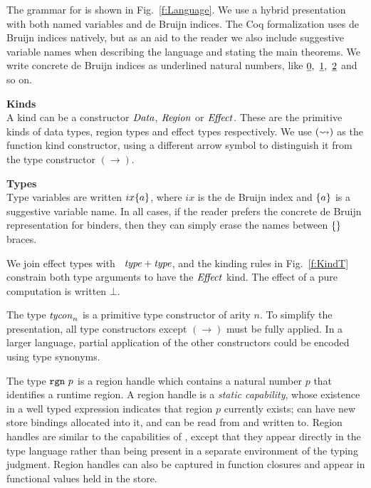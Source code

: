 
\label{s:Grammar}
The grammar for \SystemFre is shown in Fig.~\ref{f:Language}. We use a hybrid presentation with both named variables and de Bruijn indices. The Coq formalization uses de Bruijn indices natively, but as an aid to the reader we also include suggestive variable names when describing the language and stating the main theorems. We write concrete de Bruijn indices as underlined natural numbers, like $\underline{0},~ \underline{1},~ \underline{2}$ and so on.




\smallskip
\noindent
\textbf{Kinds}\\
A kind can be a constructor $\mathit{Data}$, $\mathit{Region}$ or $\mathit{Effect}$. These are the primitive kinds of data types, region types and effect types respectively. We use $(\rightsquigarrow)$ as the function kind constructor, using a different arrow symbol to distinguish it from the type constructor $(\to)$. 


\smallskip
\noindent
\textbf{Types}\\
Type variables are written $ix\{a\}$, where $ix$ is the de Bruijn index and $\{a\}$ is a suggestive variable name. In all cases, if the reader prefers the concrete de Bruijn representation for binders, then they can simply erase the names between $\{\}$ braces. 

We join effect types with ~$\mathit{type} + \mathit{type}$, and the kinding rules in Fig.~\ref{f:KindT} constrain both type arguments to have the $\mathit{Effect}$ kind. The effect of a pure computation is written $\bot$. 

The type $\mathit{tycon}_n$ is a primitive type constructor of arity $n$. To simplify the presentation, all type constructors except $(\to)$ must be fully applied. In a larger language, partial application of the other constructors could be encoded using type synonyms.

The type $\texttt{rgn}~ p$ is a region handle which contains a natural number $p$ that identifies a runtime region.  A region handle is a \emph{static capability}, whose existence in a well typed expression indicates that region $p$ currently exists; can have new store bindings allocated into it, and can be read from and written to. Region handles are similar to the capabilities of \cite{Walker:static-capabilities}, except that they appear directly in the type language rather than being present in a separate environment of the typing judgment. Region handles can also be captured in function closures and appear in functional values held in the store.


